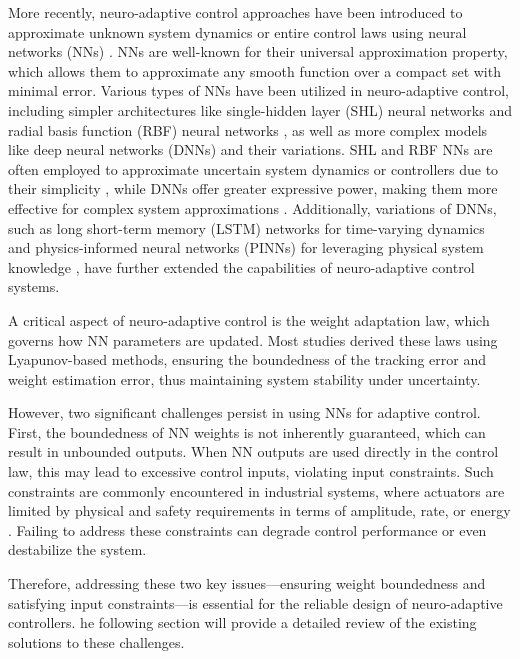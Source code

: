 \documentclass[lettersize,journal]{IEEEtran}
\begin{document}
More recently, neuro-adaptive control approaches have been introduced to approximate unknown system dynamics or entire control laws using neural networks (NNs) \cite{Farrell:2006aa}. 
NNs are well-known for their universal approximation property, which allows them to approximate any smooth function over a compact set with minimal error. 
Various types of NNs have been utilized in neuro-adaptive control, including simpler architectures like single-hidden layer (SHL) neural networks \cite{Ge:2010aa, Yesildirek:1995aa} and radial basis function (RBF) neural networks \cite{Liu:2013ab,Ge:2002aa}, as well as more complex models like deep neural networks (DNNs) \cite{Patil:2022aa} and their variations. 
SHL and RBF NNs are often employed to approximate uncertain system dynamics or controllers due to their simplicity \cite{Esfandiari:2014aa,Esfandiari:2015aa,Yesildirek:1995aa,Gao:2006aa}, while DNNs offer greater expressive power, making them more effective for complex system approximations \cite{Rolnick:2017aa}. 
Additionally, variations of DNNs, such as long short-term memory (LSTM) networks for time-varying dynamics \cite{Liu:2013ab} and physics-informed neural networks (PINNs) for leveraging physical system knowledge \cite{Hart:2024aa}, have further extended the capabilities of neuro-adaptive control systems.

A critical aspect of neuro-adaptive control is the weight adaptation law, which governs how NN parameters are updated. 
Most studies derived these laws using Lyapunov-based methods, ensuring the boundedness of the tracking error and weight estimation error, thus maintaining system stability under uncertainty.

However, two significant challenges persist in using NNs for adaptive control. 
First, the boundedness of NN weights is not inherently guaranteed, which can result in unbounded outputs. 
When NN outputs are used directly in the control law, this may lead to excessive control inputs, violating input constraints. 
Such constraints are commonly encountered in industrial systems, where actuators are limited by physical and safety requirements in terms of amplitude, rate, or energy \cite{Esfandiari:2021aa}. 
Failing to address these constraints can degrade control performance or even destabilize the system.

Therefore, addressing these two key issues—ensuring weight boundedness and satisfying input constraints—is essential for the reliable design of neuro-adaptive controllers. 
he following section will provide a detailed review of the existing solutions to these challenges.
\end{document}
